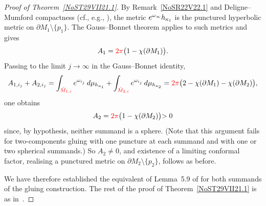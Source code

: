\documentclass[10pt,a4paper]{article}
\numberwithin{equation}{section}
\newcommand{\mv}{\omega}%
\newcommand{\red}[1]{{\color{red}#1}}
\newcommand{\zMone}{\red{{\hat M}_{1,i}}}
\newcommand{\zMtwo}{\red{{\hat M}_{2,i}}}
\begin{document}
\begin{proof}[Proof of Theorem~\ref{NoST29VII21.1}]
By Remark~\ref{NoSR22V22.1} and Deligne--Mumford compactness (cf., e.g., \cite[Proposition~A.2, Appendix~A.1]{RupflinToppingZhu}), the metric ${\rm e}^{\omega_\infty}h_{\kappa_1}$ is the punctured hyperbolic metric on $\partial M_1\setminus \{p_1\}$.
The Gauss--Bonnet theorem applies to such metrics and gives
\begin{equation*}%
 A_1 = \red{2\pi}
 \big(
 1-\chi(\partial M_1)
 \big).
\end{equation*}
Passing to the limit $j\to\infty$ in the Gauss--Bonnet identity,
\begin{equation*}%
 A_{1,i_j } + A_{2,i_j }
 =\int_{\zMone } {\rm e}^{\mv_{i_j} }\, {\rm d}\mu_{h_{\kappa_1}} +
 \int_{\zMtwo } {\rm e}^{\mv_{i_j}}\, {\rm d}\mu_{h_{\kappa_2}}
 = \red{2\pi}
 \big(
 2-\chi(\partial M_1) - \chi(\partial M_2)
 \big),
\end{equation*}
one obtains
\begin{equation*}%
 A_2 = \red{2\pi}
 \big(
 1-\chi(\partial M_2)
 \big)
 {>0}
\end{equation*}
{since, by hypothesis, neither summand is a sphere. (Note that this argument fails for two-components gluing with one puncture at each summand and with one or two spherical summands.)}
So $A_2\ne 0$, and existence of a limiting conformal factor, realising a punctured metric on $\partial M_2\setminus \{p_2\}$, follows as before.

We have therefore established the equivalent of Lemma~5.9 of \cite{CDW} for both summands of the gluing construction.
The rest of the proof of Theorem~\ref{NoST29VII21.1}
is as in~\cite{CDW}.
\end{proof}
\end{document}
